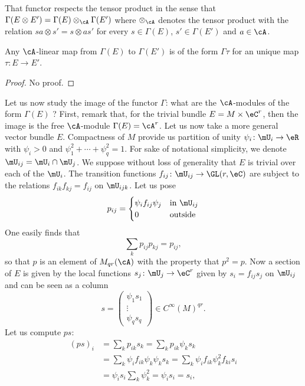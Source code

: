That functor respects the tensor product in the sense that $\Gamma(E\otimes E')=\Gamma(E)\otimes_{\cA}\Gamma(E')$ where $\otimes_{\cA}$ denotes the tensor product with the relation $sa\otimes s'=s\otimes as'$ for every $s\in\Gamma(E)$, $s'\in\Gamma(E')$ and $a\in\cA$.

\begin{proposition}
Any $\cA$-linear map from $\Gamma(E)$ to $\Gamma(E')$ is of the form $\Gamma\tau$ for an unique map $\tau\colon E\to E'$.
\end{proposition}

\begin{proof}
No proof.
\end{proof}

Let us now study the image of the functor $\Gamma$: what are the $\cA$-modules of the form $\Gamma(E)$ ? First, remark that, for the trivial bundle $E=M\times\eC^r$, then the image is the free $\cA$-module $\Gamma(E)=\cA^r$. Let us now take a more general vector bundle $E$. Compactness of $M$ provide us partition of unity $\psi_i\colon  \mU_i\to \eR$ with $\psi_i>0$ and $\psi_1^2+\cdots+\psi_q^2=1$. For sake of notational simplicity, we denote $\mU_{ij}=\mU_i\cap\mU_j$.  We suppose without loss of generality that $E$ is trivial over each of the $\mU_i$. The transition functions $f_{ij}\colon \mU_{ij}\to \GL(r,\eC)$ are subject to the relations $f_{ik}f_{kj}=f_{ij}$ on $\mU_{ijk}$. Let us pose
\begin{equation}
 p_{ij}=
\begin{cases}
	\psi_if_{ij}\psi_j&\text{in }\mU_{ij}\\
	0&\text{outside}
\end{cases}
\end{equation}
One easily finds that
\[ 
  \sum_kp_{ij}p_{kj}=p_{ij},
\]
so that $p$ is an element of $M_{qr}(\cA)$ with the property that $p^2=p$. Now a section of $E$ is given by the local functions $s_j\colon \mU_j\to \eC^r$ given by $s_i=f_{ij}s_j$ on $\mU_{ij}$ and can be seen as a column
\begin{equation}
s=
\begin{pmatrix}
\psi_1s_1\\\vdots\\\psi_qs_q
\end{pmatrix}\in C^{\infty}(M)^{qr}.
\end{equation}
Let us compute $ps$:
\[ 
\begin{split}
(ps)_i	&=\sum_kp_{ik}s_k
	=\sum_kp_{ik}\psi_ks_k\\
	&=\sum_k\psi_if_{ik}\psi_k\psi_ks_k
	=\sum_k\psi_if_{ik}\psi_k^2f_{ki}s_i\\
	&=\psi_is_i\sum_k\psi_k^2
	=\psi_is_i=s_i,
\end{split}  
\]
